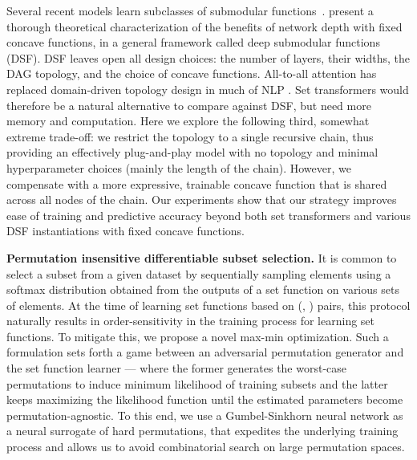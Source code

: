 \documentclass{article}
\newcommand{\xhdr}[1]{\noindent\textbf{#1.}}
\renewcommand{\cite}{\citep}
\begin{document}
Several recent models learn subclasses of submodular functions~\citep{lin2012learning, tschiatschek2014learning, tschiatschek2018differentiable}.  \citet{bilmes2017deep} present a thorough theoretical characterization of the benefits of network depth with fixed concave functions, in a general framework called deep submodular functions (DSF).
DSF leaves open all design choices: the number of layers, their widths, the DAG topology, and the choice of concave functions. 
All-to-all attention has replaced domain-driven topology design in much of NLP \cite{devlin2018bert}.  Set transformers \citep{lee2019set} would therefore be a natural alternative to compare against DSF, but need more memory and computation.
Here we explore the following third, somewhat extreme trade-off:
we restrict the topology to a single recursive chain,
thus providing an effectively plug-and-play model with no topology and minimal 
hyperparameter choices (mainly the length of the chain).
However, we compensate with a more expressive, trainable concave function that is shared across all nodes of the chain.
Our experiments show that our strategy improves ease of training and predictive accuracy beyond both set transformers and various DSF instantiations with fixed concave functions.

\xhdr{Permutation insensitive differentiable subset selection} 
It is common \cite{tschiatschek2014learning, sakaue2021differentiable,powers2018differentiable} to select a subset from a given dataset by sequentially sampling   elements using a softmax distribution obtained from the outputs of a set function on various sets of elements. At the time of learning
set functions based on (\tuniv, \thigh) pairs,
this protocol naturally results in order-sensitivity in the training process for learning set functions.
To mitigate this, we propose a novel max-min optimization.
Such a formulation sets forth a game between an adversarial permutation generator and the set function learner --- where
the former generates the worst-case permutations to induce minimum
likelihood of training subsets and the latter keeps maximizing the likelihood function 
until the estimated parameters become permutation-agnostic.
%
To this end, we use a Gumbel-Sinkhorn neural network \cite{mena2018learning,permgnn,demaximum,roy2022interpretable} as a neural surrogate of hard permutations,  that expedites the underlying training process and allows us to avoid combinatorial search on large permutation spaces. 
\end{document}

